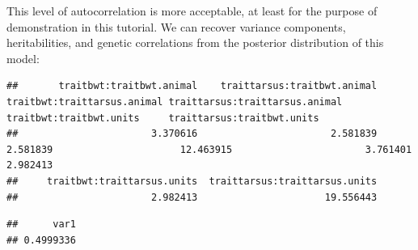 \documentclass[
  12pt,
]{book}
\newenvironment{Shaded}{\begin{snugshade}}{\end{snugshade}}
\newcommand{\FloatTok}[1]{\textcolor[rgb]{0.00,0.00,0.81}{#1}}
\newcommand{\FunctionTok}[1]{\textcolor[rgb]{0.00,0.00,0.00}{#1}}
\newcommand{\NormalTok}[1]{#1}
\newcommand{\OtherTok}[1]{\textcolor[rgb]{0.56,0.35,0.01}{#1}}
\newcommand{\SpecialCharTok}[1]{\textcolor[rgb]{0.00,0.00,0.00}{#1}}
\newcommand{\StringTok}[1]{\textcolor[rgb]{0.31,0.60,0.02}{#1}}
\begin{document}
This level of autocorrelation is more acceptable, at least for the purpose of demonstration in this tutorial.
We can recover variance components, heritabilities, and genetic correlations from the posterior distribution of this model:

\begin{Shaded}
\end{Shaded}

\begin{verbatim}
##       traitbwt:traitbwt.animal    traittarsus:traitbwt.animal    traitbwt:traittarsus.animal traittarsus:traittarsus.animal        traitbwt:traitbwt.units     traittarsus:traitbwt.units 
##                       3.370616                       2.581839                       2.581839                      12.463915                       3.761401                       2.982413 
##     traitbwt:traittarsus.units  traittarsus:traittarsus.units 
##                       2.982413                      19.556443
\end{verbatim}

\begin{Shaded}
\end{Shaded}

\begin{verbatim}
##      var1 
## 0.4999336
\end{verbatim}

\begin{Shaded}
\end{Shaded}
\end{document}
